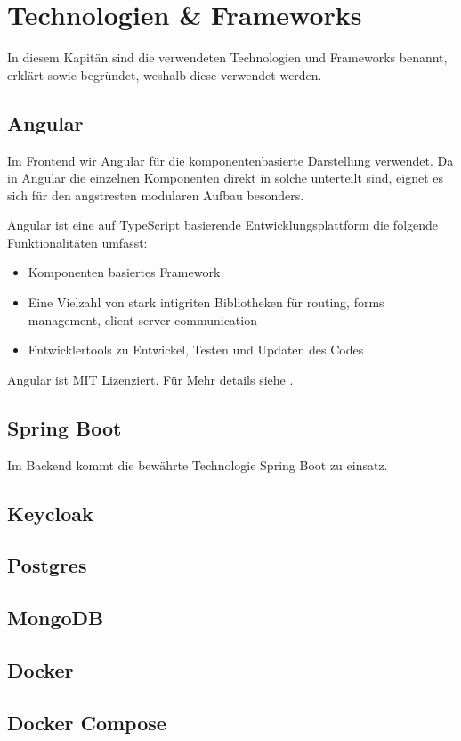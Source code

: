 \chapter{Technologien & Frameworks}

In diesem Kapitän sind die verwendeten Technologien und Frameworks benannt, erklärt
sowie begründet, weshalb diese verwendet werden.

\section{Angular}

Im Frontend wir Angular für die komponentenbasierte Darstellung verwendet.
Da in Angular die einzelnen Komponenten direkt in solche unterteilt sind,
eignet es sich für den angstresten modularen Aufbau besonders.

Angular ist eine auf \gls{TypeScript} basierende Entwicklungsplattform die folgende Funktionalitäten umfasst:
\begin{itemize}
    \item Komponenten basiertes Framework
    \item Eine Vielzahl von stark intigriten Bibliotheken für routing, forms management, client-server communication
    \item Entwicklertools zu Entwickel, Testen und Updaten des Codes
\end{itemize}
\cite{about-angular}

Angular ist MIT Lizenziert.
Für Mehr details siehe .

\section{Spring Boot}

Im Backend kommt die bewährte Technologie Spring Boot zu einsatz.



\section{Keycloak}


\section{Postgres}

\section{MongoDB}


\section{Docker}


\section{Docker Compose}


